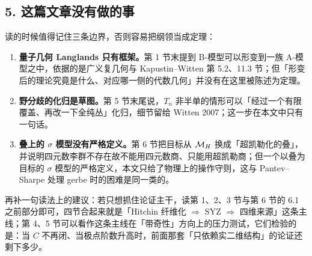 \subsection*{5. 这篇文章没有做的事}

读的时候值得记住三条边界，否则容易把纲领当成定理：

\begin{enumerate}[leftmargin=1.6em,itemsep=2pt]
\item \textbf{量子几何 Langlands 只有框架。}第 1 节末提到 B-模型可以形变到一族 A-模型之中，依据的是广义复几何与 Kapustin--Witten 第 5.2、11.3 节；但「形变后的理论究竟是什么、对应哪一侧的代数几何」并没有在这里被陈述为定理。
\item \textbf{野分歧的化归是草图。}第 5 节末尾说，$T_{n}$ 非半单的情形可以「经过一个有限覆盖、再改一下全纯丛」化归，细节留给 Witten 2007\cite{Witten2007}；这一步在本文中只有一句话。
\item \textbf{叠上的 $\sigma$ 模型没有严格定义。}第 6 节把目标从 $\mathcal{M}_{H}$ 换成「超凯勒化的叠」，并说明四元数李群不存在故不能用四元数商、只能用超凯勒商；但一个以叠为目标的 $\sigma$ 模型的严格定义，本文只给了物理上的操作守则，这与 Pantev--Sharpe 处理 gerbe 时的困难是同一类的\cite{PantevSharpe2006}。
\end{enumerate}

再补一句读法上的建议：若只想抓住论证主干，读第 1、2、3 节与第 6 节的 6.1 之前部分即可，四节合起来就是「Hitchin 纤维化 $\Rightarrow$ SYZ $\Rightarrow$ 四维来源」这条主线；第 4、5 节可以看作这条主线在「带奇性」方向上的压力测试，它们检验的是：当 $C$ 不再闭、当极点阶数升高时，前面那套「只依赖实二维结构」的论证还剩下多少。

\vspace{0.6em}
